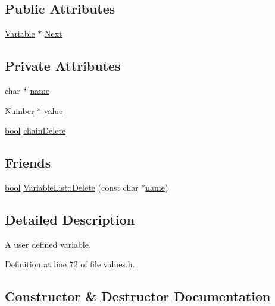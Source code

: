 \subsection*{Public Attributes}
\begin{DoxyCompactItemize}
\item 
\hyperlink{classVariable}{Variable} $\ast$ \hyperlink{classVariable_ac5662d23fccccf25e3565793841ce580}{Next}
\end{DoxyCompactItemize}
\subsection*{Private Attributes}
\begin{DoxyCompactItemize}
\item 
char $\ast$ \hyperlink{classVariable_a821b09d0920ea8685fc2e4c804106416}{name}
\item 
\hyperlink{structNumber}{Number} $\ast$ \hyperlink{classVariable_a97f7747dc30797f29b247e26ca585c94}{value}
\item 
\hyperlink{platform_8h_a1062901a7428fdd9c7f180f5e01ea056}{bool} \hyperlink{classVariable_a6e66c424bc0100bf3d4ab2bb64576a5a}{chain\+Delete}
\end{DoxyCompactItemize}
\subsection*{Friends}
\begin{DoxyCompactItemize}
\item 
\hyperlink{platform_8h_a1062901a7428fdd9c7f180f5e01ea056}{bool} \hyperlink{classVariable_ad5c7006b0b5c87423c5b8217d5e96bde}{Variable\+List\+::\+Delete} (const char $\ast$\hyperlink{classVariable_a821b09d0920ea8685fc2e4c804106416}{name})
\end{DoxyCompactItemize}


\subsection{Detailed Description}
A user defined variable. 

Definition at line 72 of file values.\+h.



\subsection{Constructor \& Destructor Documentation}
